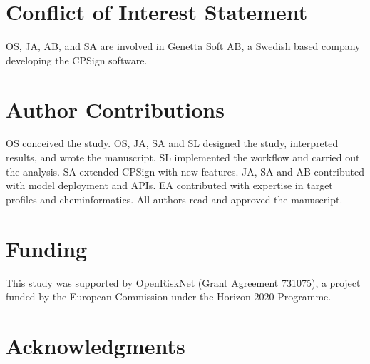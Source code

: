 \documentclass[utf8]{frontiersSCNS} %
\begin{document}
\section*{Conflict of Interest Statement}
OS, JA, AB, and SA are involved in Genetta Soft AB, a Swedish based company developing the CPSign software.


\section*{Author Contributions}
OS conceived the study. OS, JA, SA and SL designed the study, interpreted results, and wrote the manuscript. SL implemented the workflow and carried out the analysis. SA extended CPSign with new features. JA, SA and AB contributed with model deployment and APIs. EA contributed with expertise in target profiles and cheminformatics. All authors read and approved the manuscript.



\section*{Funding}
This study was supported by OpenRiskNet (Grant Agreement 731075), a project funded by the European Commission under the Horizon 2020 Programme.

\section*{Acknowledgments}
\end{document}
